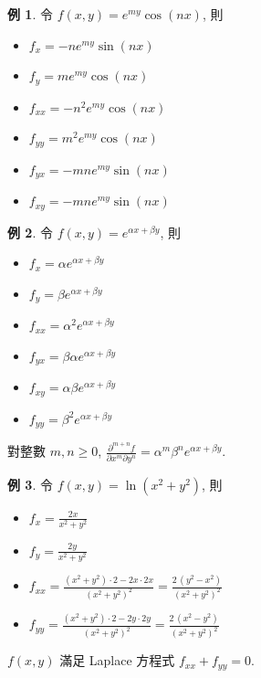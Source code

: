 \documentclass[12pt]{extarticle}
\newcommand{\ds}{\displaystyle}
\theoremstyle{definition}
\newtheorem*{ex}{例}
\newcommand{\al}{\alpha}
\newcommand{\be}{\beta}
\begin{document}
\begin{ex}
  令 $\ds f(x,y) = e^{my}\cos(nx)$, 則
  \begin{multicols}{3}
    \begin{itemize}\setlength{\itemsep}{0pt}
      \item $\ds f_x = -n e^{my}\sin(nx)$
      \item $\ds f_y = m e^{my}\cos(nx)$
      \item $\ds f_{xx} = -n^2 e^{my}\cos(nx)$
      \item $\ds f_{yy} = m^2 e^{my}\cos(nx)$
      \item $\ds f_{yx} = -m n e^{my}\sin(nx)$
      \item $\ds f_{xy} = -m n e^{my}\sin(nx)$
    \end{itemize}
  \end{multicols}
\end{ex}

\begin{ex}
  令 $\ds f(x,y) = e^{\al x+\be y}$, 則
  \begin{multicols}{3}
    \begin{itemize}\setlength{\itemsep}{0pt}
      \item $\ds f_x = \al e^{\al x+\be y}$ 
      \item $\ds f_y = \be e^{\al x+\be y}$
      \item $\ds f_{xx} = \al^2 e^{\al x+\be y}$
      \item $\ds f_{yx} = \be\al e^{\al x+\be y}$
      \item $\ds f_{xy} = \al\be e^{\al x+\be y}$
      \item $\ds f_{yy} = \be^2 e^{\al x+\be y}$
    \end{itemize}
  \end{multicols}
  對整數 $m, n\geqslant 0$, $\ds\frac{\partial^{m+n} f}{\partial x^m\partial y^n} = \al^m\be^n e^{\al x+\be y}$. 
\end{ex}

\begin{ex}
  令 $\ds f(x,y) = \ln(x^2 + y^2)$, 則
  \begin{multicols}{2}
    \begin{itemize}\setlength{\itemsep}{0pt}
      \item $\ds f_x = \frac{2x}{x^2 + y^2}$ 
      \item $\ds f_y = \frac{2y}{x^2 + y^2}$ 
      \item $\ds f_{xx} = \frac{(x^2 + y^2)\cdot 2 - 2x\cdot 2x}{(x^2 + y^2)^2} = \frac{2\,(y^2 - x^2)}{(x^2 + y^2)^2}$
      \item $\ds f_{yy} = \frac{(x^2 + y^2)\cdot 2 - 2y\cdot 2y}{(x^2 + y^2)^2} = \frac{2\,(x^2 - y^2)}{(x^2 + y^2)^2}$
    \end{itemize}
  \end{multicols}
  $\ds f(x, y)$ 滿足 Laplace 方程式 $\ds f_{xx} + f_{yy} = 0$. 
\end{ex}
\end{document}
